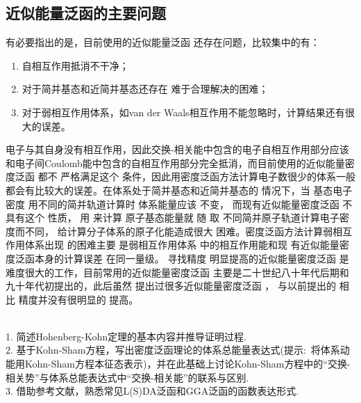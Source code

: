 {\subsection{近似能量泛函的主要问题}
有必要指出的是，目前使用的{近似能量}泛函%
还存在问题，比较集中的有：
\begin{enumerate}
	\item 自相互作用抵消不干净；
	\item 对于简并基态和近简并基态还存在%
{难于合理解决的困难}；
	\item 对于弱相互作用体系，如van der Waals相互作用不能忽略时，{计算结果}还有很大的误差。%
\end{enumerate}
电子与{其}自身没有相互作用，因此交换-相关能中包含的电子自相互作用部分应该和电子间Coulomb能中包含的自相互作用部分完全抵消，而目前使用的{近似能量密度}泛函%
都不%
{严格满足}这个%
{条件}，因此{用}密度泛函方法计算电子数很少的体系一般都会有比较大的误差。{在体系处于}简并基态和近简并基态的%
{情况下}，当%
基态电子密度%
{用}不同的简并轨道{计算}时%
体系能量应该%
{不变}，%
{而现有近似能量密度}泛函%
不具有这个%
{性质}，%
用%
{来}计算%
原子基态能量就%
随%
取%
不同简并原子轨道{计算电子密度}而不同\cite{PRB43-6865_1991,CPL265-481_1997}，%
给计算分子体系的原子化能造成很大%
困难。密度泛函方法计算弱相互作用体系出现%
的{困难}主要%
是弱相互作用体系%
{中的相互作用}能和现%
{有近似能量密度泛函}本身的{计算}误差%
{在同一量级}。%
寻找精度%
明显提高的近似能量密度泛函%
是难度很大的工作，目前常用的{近似能量密度}泛函%
主要是二十世纪八十年代后期和九十年代初提出的，此后虽然%
{提出过很多}近似{能量密度}泛函%
，%
与以前提出的%
相比%
{精度并}没有很明显的%
{提高}。

\\
1. 简述\textrm{Hohenberg-Kohn}定理的基本内容并推导证明过程.\\
2. 基于\textrm{Kohn-Sham}方程，写出密度泛函理论的体系总能量表达式(提示:~将体系动能用Kohn-Sham方程本征态表示)，并在此基础上讨论\textrm{Kohn-Sham}方程中的``交换-相关势''与体系总能表达式中``交换-相关能''的联系与区别.\\
3. 借助参考文献，熟悉常见\textrm{L(S)DA}泛函和\textrm{GGA}泛函的函数表达形式.%

}
